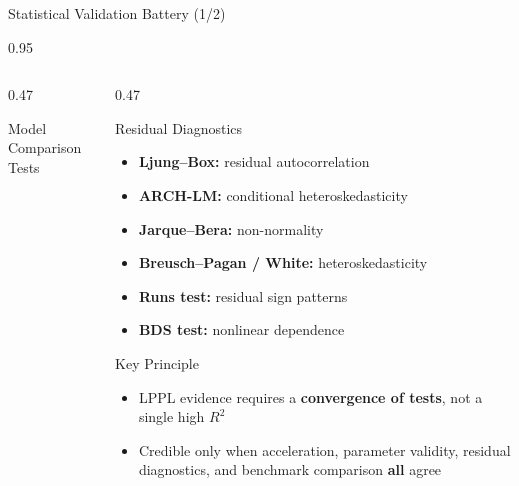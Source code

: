 \documentclass[9pt, aspectratio=169, t]{beamer}
\begin{document}
\begin{frame}{Statistical Validation Battery (1/2)}
\begin{cminipage}{0.95\textwidth}
{\begin{columns}[T]
\begin{column}{0.47\textwidth}
\begin{alertblock}{Model Comparison Tests}
\begin{itemize}
                \end{itemize}
            \end{alertblock}
        \end{column}
        \begin{column}{0.47\textwidth}
            \begin{exampleblock}{Residual Diagnostics}
                \begin{itemize}\setlength{\itemsep}{0pt}
                    \item \textbf{Ljung--Box:} residual autocorrelation
                    \item \textbf{ARCH-LM:} conditional heteroskedasticity
                    \item \textbf{Jarque--Bera:} non-normality
                    \item \textbf{Breusch--Pagan / White:} heteroskedasticity
                    \item \textbf{Runs test:} residual sign patterns
                    \item \textbf{BDS test:} nonlinear dependence
                \end{itemize}
            \end{exampleblock}
            \vspace{-2mm}
            \begin{block}{Key Principle}
                \begin{itemize}\setlength{\itemsep}{0pt}
                    \item LPPL evidence requires a \textbf{convergence of tests}, not a single high $R^2$
                    \item Credible only when acceleration, parameter validity, residual diagnostics, and benchmark comparison \textbf{all} agree
                \end{itemize}
            \end{block}
        \end{column}
    \end{columns}
    }
    \end{cminipage}
\end{frame}
\end{document}

